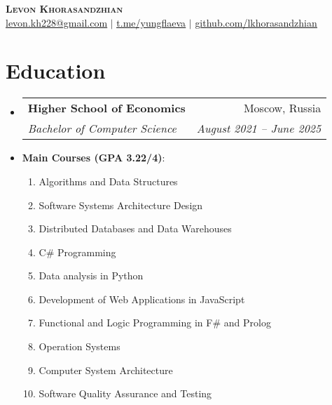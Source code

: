 \documentclass[letterpaper,11pt]{article}
\makeatletter
\newcommand{\resumeItem}[1]{
  \item\small{
    {#1 \vspace{-2pt}}
  }
}
\newcommand{\resumeSubheading}[4]{
  \vspace{-2pt}\item
    \begin{tabular*}{0.97\textwidth}[t]{l@{\extracolsep{\fill}}r}
      \textbf{#1} & #2 \\
      \textit{\small#3} & \textit{\small #4} \\
    \end{tabular*}\vspace{-7pt}
}
\newcommand{\resumeSubHeadingListStart}{\begin{itemize}[leftmargin=0.15in, label={}]}
\newcommand{\resumeSubHeadingListEnd}{\end{itemize}}
\makeatother
\begin{document}

\begin{center}
    \textbf{\Huge \scshape Levon Khorasandzhian} \\ \vspace{1pt}
    \href{mailto:levon.kh228@gmail.com}{\underline{levon.kh228@gmail.com}} $|$ 
    \href{https://t.me/yungflaeva}{\underline{t.me/yungflaeva}} $|$
    \href{https://github.com/lkhorasandzhian}{\underline{github.com/lkhorasandzhian}}
\end{center}


\section{Education}
  \resumeSubHeadingListStart
    \resumeSubheading
      {Higher School of Economics}{Moscow, Russia}
      {Bachelor of Computer Science}{August 2021 -- June 2025}
      \resumeItem
    {\textbf{Main Courses (GPA 3.22/4)}:
    \begin{enumerate}
        \item Algorithms and Data Structures
        \item Software Systems Architecture Design
        \item Distributed Databases and Data Warehouses
        \item C\# Programming
        \item Data analysis in Python
        \item Development of Web Applications in JavaScript
        \item Functional and Logic Programming in F\# and Prolog
        \item Operation Systems
        \item Computer System Architecture
        \item Software Quality Assurance and Testing
    \end{enumerate}
    }
  \resumeSubHeadingListEnd

\end{document}
